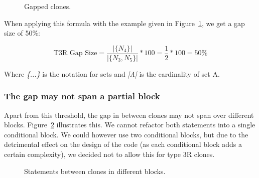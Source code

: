 \begin{figure}[H]
\begin{parcolumns}{2}
\end{parcolumns}
\caption{Gapped clones.}
\label{fig:gappedclones}
\end{figure}

When applying this formula with the example given in Figure~\ref{fig:gappedclones}, we get a gap size of 50\%:

\begin{equation}\label{eq:type3rexample}
\text{T3R Gap Size}=\frac{|\{N_{4}\}|}{|\{N_{3}, N_{5}\}|}*100 = \frac{1}{2}*100 = 50\%
\end{equation}

Where \textit{\{...\}} is the notation for sets and \textit{|A|} is the cardinality of set A.

\subsubsection{The gap may not span a partial block} \label{sec:t3rpartialblock}
Apart from this threshold, the gap in between clones may not span over different blocks. Figure~\ref{fig:type3invalid} illustrates this. We cannot refactor both statements into a single conditional block. We could however use two conditional blocks, but due to the detrimental effect on the design of the code (as each conditional block adds a certain complexity), we decided not to allow this for type 3R clones.

\begin{figure}[H]
\begin{parcolumns}{2}
\end{parcolumns}
\caption{Statements between clones in different blocks.}
\label{fig:type3invalid}
\end{figure}

